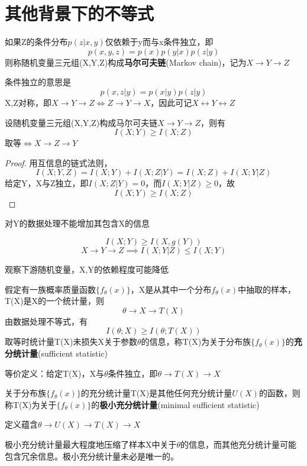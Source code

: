 \documentclass{ctexbook}
\begin{document}
\section{其他背景下的不等式}

\begin{definition}
    如果Z的条件分布$p(z|x,y)$仅依赖于y而与x条件独立，即
    \[p(x,y,z) = p(x)p(y|x)p(z|y)\]
    则称随机变量三元组(X,Y,Z)构成\textbf{马尔可夫链}(Markov chain)，记为$X \to Y \to Z$

    条件独立的意思是
    \[p(x,z|y) = p(x|y)p(z|y)\]
    X,Z对称，即$X \to Y \to Z \iff Z \to Y \to X$，因此可记$X \leftrightarrow Y \leftrightarrow Z$
\end{definition}

\begin{theorem}[数据处理不等式]
    设随机变量三元组(X,Y,Z)构成马尔可夫链$X \to Y \to Z$，则有
    \[I(X;Y) \geq I(X;Z)\]
    取等$\iff X \to Z \to Y$
\end{theorem}
\begin{proof}
    用互信息的链式法则，
    \[I(X;Y,Z) = I(X;Y) + I(X;Z|Y) = I(X;Z) + I(X;Y|Z)\]
    给定Y，X与Z独立，即$I(X;Z|Y)=0$，而$I(X;Y|Z)\geq 0$，故
    \[I(X;Y) \geq I(X;Z)\]
\end{proof}
\begin{remark}
    对Y的数据处理不能增加其包含X的信息
\end{remark}
\begin{corollary}
    \[I(X;Y)\geq I(X,g(Y))\]
    \[X \to Y \to Z\implies I(X;Y|Z)\leq I(X;Y)\]
\end{corollary}
\begin{remark}
    观察下游随机变量，X,Y的依赖程度可能降低
\end{remark}

\begin{definition}[充分统计量]
    假定有一族概率质量函数$\{f_{\theta}(x)\}$，X是从其中一个分布$f_{\theta}(x)$中抽取的样本，T(X)是X的一个统计量，则
    \[\theta \to X \to T(X)\]
    由数据处理不等式，有
    \[I(\theta;X) \geq I(\theta;T(X))\]
    取等时统计量T(X)未损失X关于参数$\theta$的信息，称T(X)为关于分布族$\{f_{\theta}(x)\}$的\textbf{充分统计量}(sufficient statistic)

    等价定义：给定T(X)，X与$\theta$条件独立，即$\theta \to T(X) \to X$
\end{definition}

\begin{definition}[极小充分统计量]
    关于分布族$\{f_{\theta}(x)\}$的充分统计量T(X)是其他任何充分统计量$U(X)$的函数，则称T(X)为关于$\{f_{\theta}(x)\}$的\textbf{极小充分统计量}(minimal sufficient statistic)
    
    定义蕴含$\theta \to U(X) \to T(X) \to X$
\end{definition}
\begin{remark}
    极小充分统计量最大程度地压缩了样本X中关于$\theta$的信息，而其他充分统计量可能包含冗余信息。极小充分统计量未必是唯一的。
\end{remark}
\end{document}
